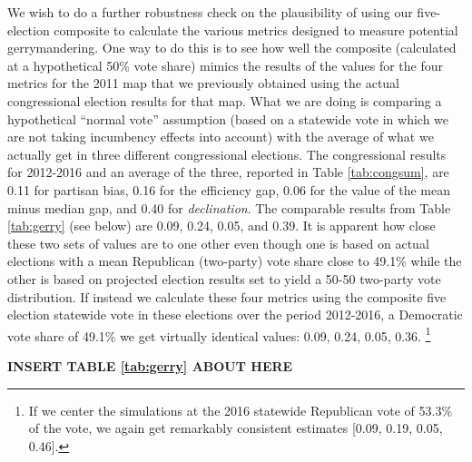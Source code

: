    We wish to do a further robustness check on the plausibility of using our five-election composite to calculate the various metrics designed to measure potential gerrymandering. One way to do this is to see how well the composite (calculated at a hypothetical 50\% vote share) mimics the results of the values for the four metrics for the 2011 map that we previously obtained using the actual congressional election results for that map. What we are doing is comparing a hypothetical ``normal vote'' \citep{Converse1966} assumption (based on a statewide vote in which we are not taking incumbency effects into account) with the average of what we actually get in three different congressional elections. The congressional results for 2012-2016 and an average of the three, reported in Table \ref{tab:congsum}, are 0.11 for partisan bias, 0.16 for the efficiency gap, 0.06 for the value of the mean minus median gap, and 0.40 for \textit{declination}. The comparable results from Table \ref{tab:gerry} (see below) are 0.09, 0.24, 0.05, and 0.39. It is apparent how close these two sets of values are to one other even though one is based on actual elections with a mean Republican (two-party) vote share close to 49.1\% while the other is based on projected election results set to yield a 50-50 two-party vote distribution. If instead we calculate these four metrics using the composite five election statewide vote in these elections over the period 2012-2016, a Democratic vote share of 49.1\% we get virtually identical values: 0.09, 0.24, 0.05, 0.36.
        \footnote{If we center the simulations at the 2016 statewide Republican vote of 53.3\% of the vote, we again get remarkably consistent estimates [0.09, 0.19, 0.05, 0.46].}
%
    
        \begin{center}\textbf{INSERT TABLE \ref{tab:gerry} ABOUT HERE} \end{center}
